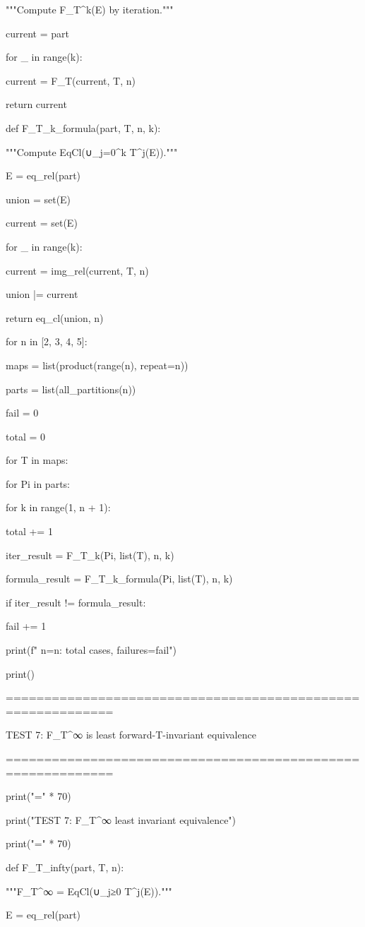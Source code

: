"""Compute F_T^k(E) by iteration."""

current = part

for _ in range(k):

current = F_T(current, T, n)

return current


def F_T_k_formula(part, T, n, k):

"""Compute EqCl(∪_{j=0}^k T^j(E))."""

E = eq_rel(part)

union = set(E)

current = set(E)

for _ in range(k):

current = img_rel(current, T, n)

union |= current

return eq_cl(union, n)


for n in [2, 3, 4, 5]:

maps = list(product(range(n), repeat=n))

parts = list(all_partitions(n))

fail = 0

total = 0

for T in maps:

for Pi in parts:

for k in range(1, n + 1):

total += 1

iter_result = F_T_k(Pi, list(T), n, k)

formula_result = F_T_k_formula(Pi, list(T), n, k)

if iter_result != formula_result:

fail += 1

print(f"  n={n}: {total} cases, failures={fail}")


print()


============================================================


TEST 7: F_T^∞ is least forward-T-invariant equivalence


============================================================


print("=" * 70)

print("TEST 7: F_T^∞ least invariant equivalence")

print("=" * 70)


def F_T_infty(part, T, n):

"""F_T^∞ = EqCl(∪_{j≥0} T^j(E))."""

E = eq_rel(part)

